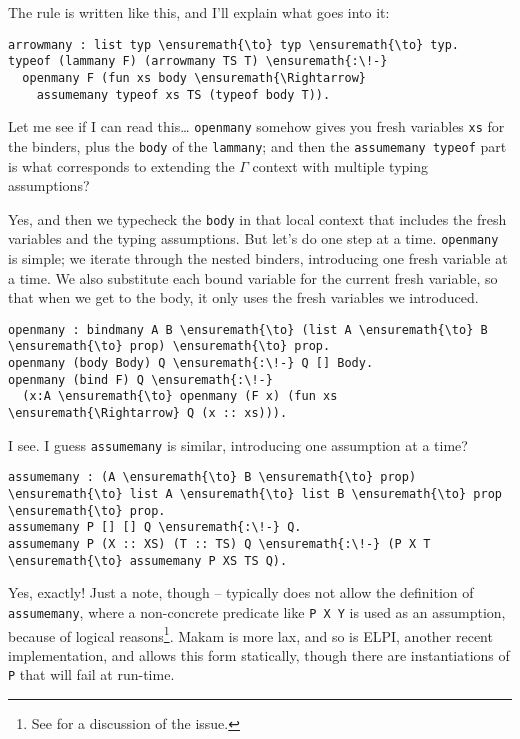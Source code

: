 \heroADVISOR{} The rule is written like this, and I'll explain what goes into
it:

\begin{verbatim}
arrowmany : list typ \ensuremath{\to} typ \ensuremath{\to} typ.
typeof (lammany F) (arrowmany TS T) \ensuremath{:\!-}
  openmany F (fun xs body \ensuremath{\Rightarrow}
    assumemany typeof xs TS (typeof body T)).
\end{verbatim}

\heroSTUDENT{} Let me see if I can read this\ldots{} \texttt{openmany} somehow
gives you fresh variables \texttt{xs} for the binders, plus the
\texttt{body} of the \texttt{lammany}; and then the
\texttt{assumemany\ typeof} part is what corresponds to extending the
\(\Gamma\) context with multiple typing assumptions?

\heroADVISOR{} Yes, and then we typecheck the \texttt{body} in that local
context that includes the fresh variables and the typing assumptions.
But let's do one step at a time. \texttt{openmany} is simple; we iterate
through the nested binders, introducing one fresh variable at a time. We
also substitute each bound variable for the current fresh variable, so
that when we get to the body, it only uses the fresh variables we
introduced.

\begin{verbatim}
openmany : bindmany A B \ensuremath{\to} (list A \ensuremath{\to} B \ensuremath{\to} prop) \ensuremath{\to} prop.
openmany (body Body) Q \ensuremath{:\!-} Q [] Body.
openmany (bind F) Q \ensuremath{:\!-}
  (x:A \ensuremath{\to} openmany (F x) (fun xs \ensuremath{\Rightarrow} Q (x :: xs))).
\end{verbatim}

\heroSTUDENT{} I see. I guess \texttt{assumemany} is similar, introducing one
assumption at a time?

\begin{verbatim}
assumemany : (A \ensuremath{\to} B \ensuremath{\to} prop) \ensuremath{\to} list A \ensuremath{\to} list B \ensuremath{\to} prop \ensuremath{\to} prop.
assumemany P [] [] Q \ensuremath{:\!-} Q.
assumemany P (X :: XS) (T :: TS) Q \ensuremath{:\!-} (P X T \ensuremath{\to} assumemany P XS TS Q).
\end{verbatim}

\heroADVISOR{} Yes, exactly! Just a note, though -- \lamprolog typically does
not allow the definition of \texttt{assumemany}, where a non-concrete
predicate like \texttt{P\ X\ Y} is used as an assumption, because of
logical
reasons\footnote{See \citet{assumemany-issue} for a discussion of the issue.}.
Makam is more lax, and so is ELPI, another recent
\lamprolog implementation, and allows this form statically, though there
are instantiations of \texttt{P} that will fail at run-time.

